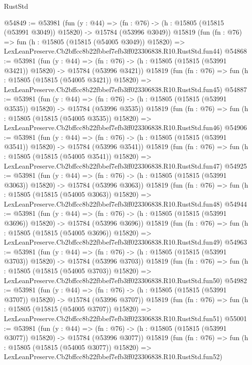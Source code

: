 \begin{lexlean}{RustStd}
\begin{coremodule}
@54849 := @53981
    (fun (y : @44) =>
    (fn : @76) -> (h : @15805 (@15815 (@53991 @3049)) @15820) -> @15784 (@53996 @3049))
    @15819
    (fun (fn : @76) =>
    fun (h : @15805 (@15815 (@54005 @3049)) @15820) =>
    LexLeanPreserve.Cb2bffcc8b22fbbef7efb3ff023306838.R10.RustStd.fun44)
@54868 := @53981
    (fun (y : @44) =>
    (fn : @76) -> (h : @15805 (@15815 (@53991 @3421)) @15820) -> @15784 (@53996 @3421))
    @15819
    (fun (fn : @76) =>
    fun (h : @15805 (@15815 (@54005 @3421)) @15820) =>
    LexLeanPreserve.Cb2bffcc8b22fbbef7efb3ff023306838.R10.RustStd.fun45)
@54887 := @53981
    (fun (y : @44) =>
    (fn : @76) -> (h : @15805 (@15815 (@53991 @3535)) @15820) -> @15784 (@53996 @3535))
    @15819
    (fun (fn : @76) =>
    fun (h : @15805 (@15815 (@54005 @3535)) @15820) =>
    LexLeanPreserve.Cb2bffcc8b22fbbef7efb3ff023306838.R10.RustStd.fun46)
@54906 := @53981
    (fun (y : @44) =>
    (fn : @76) -> (h : @15805 (@15815 (@53991 @3541)) @15820) -> @15784 (@53996 @3541))
    @15819
    (fun (fn : @76) =>
    fun (h : @15805 (@15815 (@54005 @3541)) @15820) =>
    LexLeanPreserve.Cb2bffcc8b22fbbef7efb3ff023306838.R10.RustStd.fun47)
@54925 := @53981
    (fun (y : @44) =>
    (fn : @76) -> (h : @15805 (@15815 (@53991 @3063)) @15820) -> @15784 (@53996 @3063))
    @15819
    (fun (fn : @76) =>
    fun (h : @15805 (@15815 (@54005 @3063)) @15820) =>
    LexLeanPreserve.Cb2bffcc8b22fbbef7efb3ff023306838.R10.RustStd.fun48)
@54944 := @53981
    (fun (y : @44) =>
    (fn : @76) -> (h : @15805 (@15815 (@53991 @3696)) @15820) -> @15784 (@53996 @3696))
    @15819
    (fun (fn : @76) =>
    fun (h : @15805 (@15815 (@54005 @3696)) @15820) =>
    LexLeanPreserve.Cb2bffcc8b22fbbef7efb3ff023306838.R10.RustStd.fun49)
@54963 := @53981
    (fun (y : @44) =>
    (fn : @76) -> (h : @15805 (@15815 (@53991 @3703)) @15820) -> @15784 (@53996 @3703))
    @15819
    (fun (fn : @76) =>
    fun (h : @15805 (@15815 (@54005 @3703)) @15820) =>
    LexLeanPreserve.Cb2bffcc8b22fbbef7efb3ff023306838.R10.RustStd.fun50)
@54982 := @53981
    (fun (y : @44) =>
    (fn : @76) -> (h : @15805 (@15815 (@53991 @3707)) @15820) -> @15784 (@53996 @3707))
    @15819
    (fun (fn : @76) =>
    fun (h : @15805 (@15815 (@54005 @3707)) @15820) =>
    LexLeanPreserve.Cb2bffcc8b22fbbef7efb3ff023306838.R10.RustStd.fun51)
@55001 := @53981
    (fun (y : @44) =>
    (fn : @76) -> (h : @15805 (@15815 (@53991 @3077)) @15820) -> @15784 (@53996 @3077))
    @15819
    (fun (fn : @76) =>
    fun (h : @15805 (@15815 (@54005 @3077)) @15820) =>
    LexLeanPreserve.Cb2bffcc8b22fbbef7efb3ff023306838.R10.RustStd.fun52)

\end{coremodule}
\end{lexlean}
